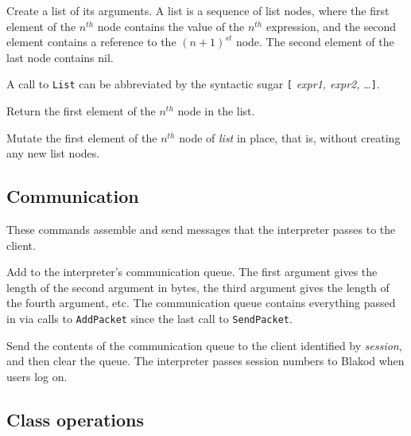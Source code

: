 \documentclass[12pt]{article}
\newenvironment{leftlines}
{\setlength{\oldindent}{\parindent}
 \setlength{\parindent}{0in}\vspace{\baselineskip}}
{\setlength{\parindent}{\oldindent}\vspace{\baselineskip}}
\begin{document}
\begin{leftlines}
\end{leftlines}

Create a list of its arguments.  A list is a sequence of list nodes,
where the first element of the $n^{th}$ node contains the value of the
$n^{th}$ expression, and the second element contains a reference to
the $(n+1)^{st}$ node.  The second element of the last node contains
nil.

A call to {\tt List} can be abbreviated by the syntactic sugar {\tt [}
{\em expr1, expr2,} \ldots {\tt ]}.

\begin{leftlines}
\end{leftlines}

Return the first element of the $n^{th}$ node in the list.

\begin{leftlines}
\end{leftlines}

Mutate the first element of the $n^{th}$ node of {\em list} in place, that is, without
creating any new list nodes.

\subsection{Communication}

These commands assemble and send messages that the interpreter passes
to the client.

\begin{leftlines}
\end{leftlines}

Add to the interpreter's communication queue.  The first argument
gives the length of the second argument in bytes, the third argument
gives the length of the fourth argument, etc.  The communication queue
contains everything passed in via calls to {\tt AddPacket} since the
last call to {\tt SendPacket}.

\begin{leftlines}
\end{leftlines}

Send the contents of the communication queue to the client identified
by {\em session}, and then clear the queue.  The interpreter passes
session numbers to Blakod when users log on.

\subsection{Class operations}
\end{document}
